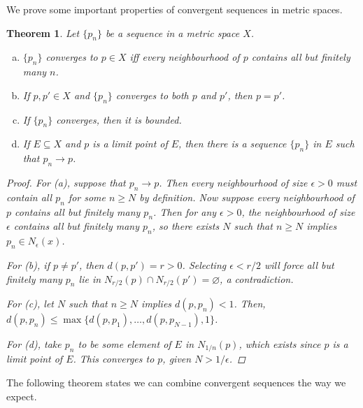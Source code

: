 \documentclass{scrbook}
\let\emptyset\varnothing
\renewcommand{\to}{\rightarrow}
\newtheorem{theorem}{Theorem}
\begin{document}
We prove some important properties of convergent sequences in metric spaces.

\begin{theorem} %
Let $\{p_n\}$ be a sequence in a metric space $X$. 
\begin{enumerate}[(a)]
\item $\{p_n\}$ converges to $p \in X$ iff every neighbourhood of $p$ contains all but finitely many $n$.
\item If $p, p' \in X$ and $\{p_n\}$ converges to both $p$ and $p'$, then $p = p'$. 
\item If $\{p_n\}$ converges, then it is bounded.
\item If $E \subseteq X$ and $p$ is a limit point of $E$, then there is a sequence $\{p_n\}$ in $E$ such that $p_n \to p$. 
\end{enumerate}

\begin{proof}
For (a), suppose that $p_n \to p$. Then every neighbourhood of size $\epsilon > 0$ must contain all $p_n$ for some $n \ge N$ by definition. Now suppose every neighbourhood of $p$ contains all but finitely many $p_n$. Then for any $\epsilon > 0$, the neighbourhood of size $\epsilon$ contains all but finitely many $p_n$, so there exists $N$ such that $n \ge N$ implies $p_n \in N_\epsilon(x)$. 

For (b), if $p \ne p'$, then $d(p, p') = r > 0$. Selecting $\epsilon < r/2$ will force all but finitely many $p_n$ lie in $N_{r/2}(p) \cap N_{r/2}(p') = \emptyset$, a contradiction.

For (c), let $N$ such that $n \ge N$ implies $d(p, p_n) < 1$. Then, $d(p, p_n) \le \max\{d(p, p_1), \dotsc, d(p, p_{N-1}), 1\}$.

For (d), take $p_n$ to be some element of $E$ in $N_{1/n}(p)$, which exists since $p$ is a limit point of $E$. This converges to $p$, given $N > 1/\epsilon$. 
\end{proof}
\end{theorem}

The following theorem states we can combine convergent sequences the way we expect. 
\end{document}

